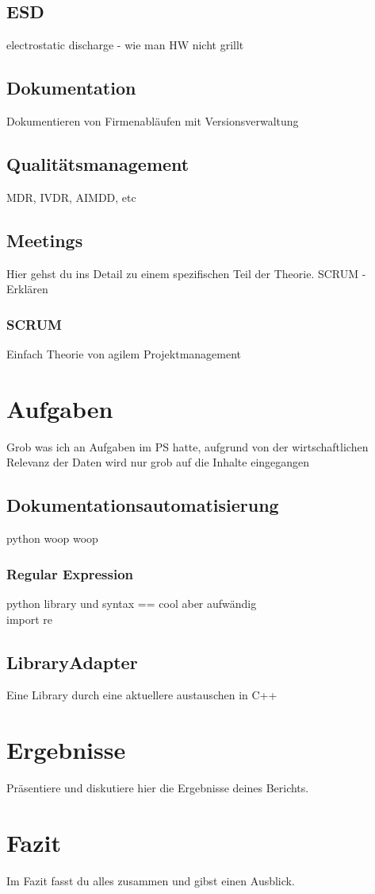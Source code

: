 \documentclass[a4paper, 12pt]{article}
\begin{document}
\subsection{ESD}\label{ESD}

electrostatic discharge - wie man HW nicht grillt
\subsection{Dokumentation}\label{Dokumentation}
Dokumentieren von Firmenabläufen mit Versionsverwaltung

\subsection{Qualitätsmanagement}\label{Qualitätsmanagement}
MDR, IVDR, AIMDD, etc


\subsection{Meetings}\label{Meetings}
Hier gehst du ins Detail zu einem spezifischen Teil der Theorie.
SCRUM - Erklären

\subsubsection{SCRUM}\label{SCRUM}
Einfach Theorie von agilem Projektmanagement

\newpage
\section{Aufgaben}\label{Aufgaben}
Grob was ich an Aufgaben im PS hatte, aufgrund von der wirtschaftlichen Relevanz der Daten wird nur grob auf die Inhalte eingegangen

\subsection{Dokumentationsautomatisierung}\label{Dokumentationsautomatisierung}
python woop woop
\subsubsection{Regular Expression}\label{regularExpression}
python library und syntax == cool aber aufwändig \\
import re

\subsection{LibraryAdapter}\label{LibraryAdapter}
Eine Library durch eine aktuellere austauschen in C++

\newpage
\section{Ergebnisse}
Präsentiere und diskutiere hier die Ergebnisse deines Berichts.

\newpage
\section{Fazit}
Im Fazit fasst du alles zusammen und gibst einen Ausblick.

\newpage

\end{document}
